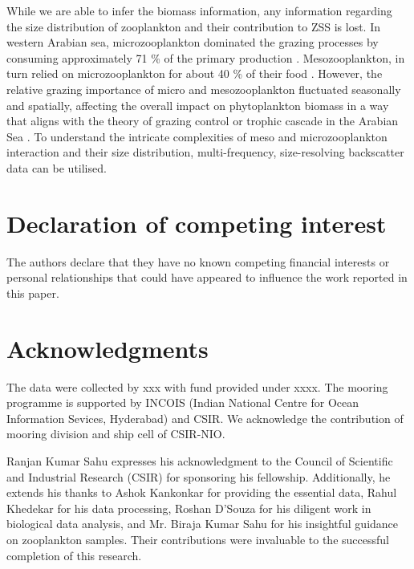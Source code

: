 \documentclass{article}
\begin{document}
	While we are able to infer the biomass information, any information regarding the size distribution of zooplankton and their contribution to ZSS is lost. In western Arabian sea, microzooplankton dominated the grazing processes by consuming approximately 71 \% of the primary production \citep{reckermann1997-kz,marra2005jgofs,landry2009-ti}. Mesozooplankton, in turn relied on microzooplankton for about 40 \% of their food \citep{landry2009-ti,hood2024nutrient}. However, the relative grazing importance of micro and mesozooplankton fluctuated seasonally and spatially, affecting the overall impact on phytoplankton biomass in a way that aligns with the theory of grazing control or trophic cascade \citep{ripple2016-nk} in the Arabian Sea \citep{marra2005jgofs,landry2009-ti}. To understand the intricate complexities of meso and microzooplankton interaction and their size distribution, multi-frequency, size-resolving backscatter data can be utilised.
	\section{Declaration of competing interest}
	The authors declare that they have no known competing financial interests or personal
	relationships that could have appeared to influence the work reported in this paper.
	
	\section{Acknowledgments} 
	The data were collected by xxx with fund provided under xxxx. The mooring programme is supported by INCOIS (Indian National Centre for Ocean Information Sevices, Hyderabad) and CSIR. We acknowledge the contribution of mooring division and ship cell of CSIR-NIO. 
	
	Ranjan Kumar Sahu expresses his acknowledgment to the Council of Scientific and Industrial Research (CSIR) for sponsoring his fellowship. Additionally, he extends his thanks to Ashok Kankonkar for providing the essential data, Rahul Khedekar for his data processing, Roshan D'Souza for his diligent work in biological data analysis, and Mr. Biraja Kumar Sahu for his insightful guidance on zooplankton samples. Their contributions were invaluable to the successful completion of this research.

\linespread{1.5}	
{\footnotesize 	 %
}	
\newpage
{} 
\end{document}
